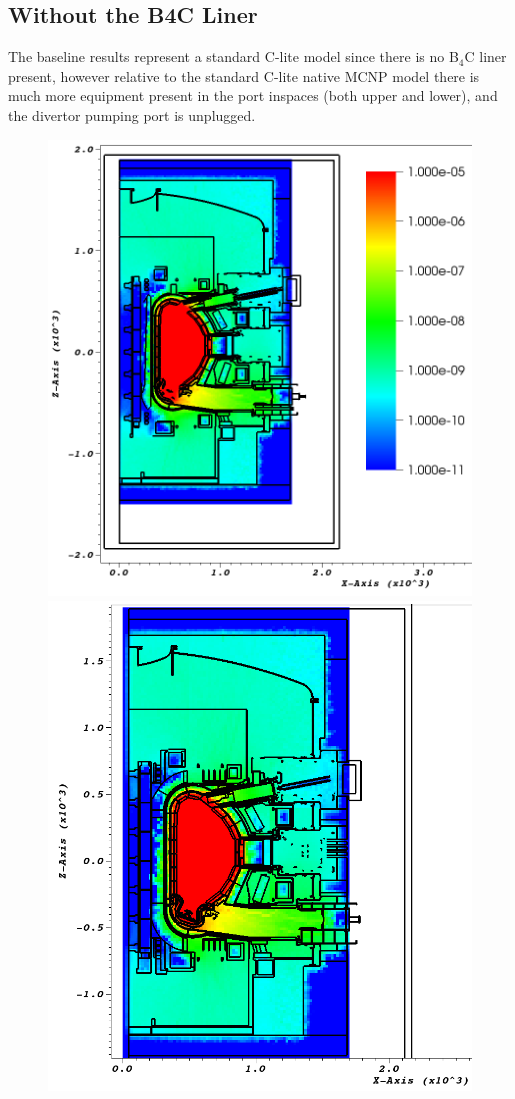 \documentclass[12pt]{article}
\begin{document}
\subsection{Without the B4C Liner}
The baseline results represent a standard C-lite model since there is no B$_4$C
liner present, however relative to the standard C-lite native MCNP model there
is much more equipment present in the port inspaces (both upper and lower), and
the divertor pumping port is unplugged. 
\begin{figure}[ht!]
  \centering
  \includegraphics[scale=0.35]{../plots/neutron/nob4c/y_0.png}
  \includegraphics[scale=0.35]{../plots/neutron/nob4c/y_-17.png}

\end{figure}
\end{document}
